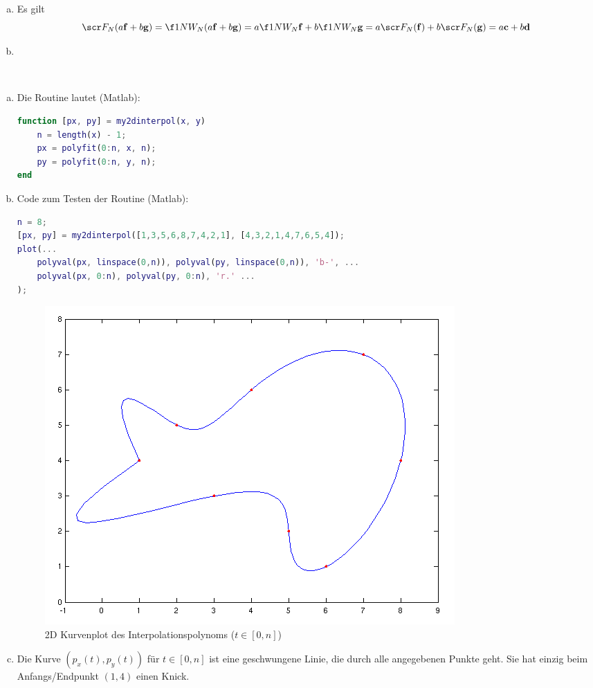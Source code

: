 \documentclass{mywork}
\begin{document}
\begin{aufgabe}
	\begin{enumerate}[a)]
		\item
			Es gilt
			\[
				\scr F_N(a\mathbf f + b\mathbf g) = \f 1N W_N (a\mathbf f + b\mathbf g) = a\f 1N W_N \mathbf f + b \f 1N W_N \mathbf g = a \scr F_N(\mathbf f) + b \scr F_N(\mathbf g) = a\mathbf c + b\mathbf d
			\]
		\item
	\end{enumerate}
\end{aufgabe}
\newpage
\begin{aufgabe}~

	\begin{enumerate}[a)]
		\item
			Die Routine lautet (Matlab):
			\begin{lstlisting}[language=matlab]
function [px, py] = my2dinterpol(x, y)
	n = length(x) - 1;
	px = polyfit(0:n, x, n);
	py = polyfit(0:n, y, n);
end
			\end{lstlisting}
		\item
			Code zum Testen der Routine (Matlab):
			\begin{lstlisting}[language=matlab]
n = 8;
[px, py] = my2dinterpol([1,3,5,6,8,7,4,2,1], [4,3,2,1,4,7,6,5,4]);
plot(...
	polyval(px, linspace(0,n)), polyval(py, linspace(0,n)), 'b-', ...
	polyval(px, 0:n), polyval(py, 0:n), 'r.' ...
);
			\end{lstlisting}
			\begin{figure}[h]
				\centering
				\caption{2D Kurvenplot des Interpolationspolynoms ($t\in [0,n]$)}
				\includegraphics[scale=0.7]{num1_3_4}
			\end{figure}
		\item
			Die Kurve $(p_x(t),p_y(t))$ für $t\in[0,n]$ ist eine geschwungene Linie, die durch alle angegebenen Punkte geht.
			Sie hat einzig beim Anfangs/Endpunkt $(1,4)$ einen Knick.
	\end{enumerate}

\end{aufgabe}
\end{document}
